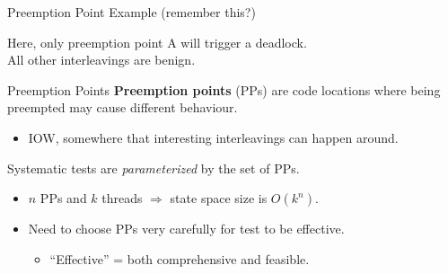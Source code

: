 \documentclass[xcolor=dvipsnames]{beamer}
\begin{document}
\begin{frame}{Preemption Point Example (remember this?)}
	\linegap

	Here, only preemption point A will trigger a deadlock. {\bf ~}\\
	All other interleavings are benign.{\bf ~}

\end{frame}

\begin{frame}{Preemption Points}
	\textbf{Preemption points} (PPs) are code locations where being preempted may cause different behaviour.
	\begin{itemize}
		\item IOW, somewhere that interesting interleavings can happen around.
	\end{itemize}
	\linegap

	Systematic tests are {\em parameterized} by the set of PPs.
	\begin{itemize}
		\item $n$ PPs and $k$ threads $\Rightarrow$ state space size is $O(k^n)$.
		\item Need to choose PPs very carefully for test to be effective.
		\begin{itemize}
			\item ``Effective'' = both comprehensive and feasible.
		\end{itemize}
	\end{itemize}
\end{frame}
\end{document}
